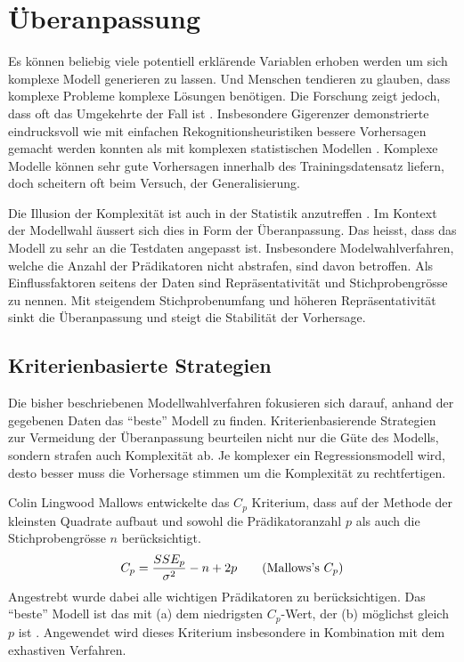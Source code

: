 \section{Überanpassung}
Es können beliebig viele potentiell erklärende Variablen erhoben werden um sich komplexe Modell generieren zu lassen. 
Und Menschen tendieren zu glauben, dass komplexe Probleme komplexe Lösungen benötigen. 
Die Forschung zeigt jedoch, dass oft das Umgekehrte der Fall ist \cite[p.3]{armstrong2011illusions}. 
Insbesondere Gigerenzer demonstrierte eindrucksvoll wie mit einfachen Rekognitionsheuristiken bessere Vorhersagen gemacht werden konnten als mit komplexen statistischen Modellen \cite{borges1999can}.
Komplexe Modelle können sehr gute Vorhersagen innerhalb des Trainingsdatensatz liefern, doch  scheitern oft beim Versuch, der Generalisierung.  

Die Illusion der Komplexität ist auch in der Statistik anzutreffen \cite[p. 3]{armstrong2011illusions}. 
Im Kontext der Modellwahl äussert sich dies in Form der Überanpassung. Das heisst, dass das Modell zu sehr an die Testdaten angepasst ist.
Insbesondere Modelwahlverfahren, welche die Anzahl der Prädikatoren nicht abstrafen, sind davon betroffen.
Als Einflussfaktoren seitens der Daten sind Repräsentativität und Stichprobengrösse zu nennen. 
Mit steigendem Stichprobenumfang und höheren Repräsentativität sinkt die Überanpassung und steigt die Stabilität der Vorhersage.

\subsection{Kriterienbasierte Strategien}
Die bisher beschriebenen Modellwahlverfahren fokusieren sich darauf, anhand der gegebenen Daten das ``beste'' Modell zu finden.
Kriterienbasierende Strategien zur Vermeidung der Überanpassung beurteilen nicht nur die Güte des Modells, sondern strafen auch Komplexität ab.
Je komplexer ein Regressionsmodell wird, desto besser muss die Vorhersage stimmen um die Komplexität zu rechtfertigen.

Colin Lingwood Mallows entwickelte das $C_p$ Kriterium, dass auf der Methode der kleinsten Quadrate  aufbaut und sowohl die Prädikatoranzahl $p$ als auch die Stichprobengrösse $n$ berücksichtigt. 
\begin{equation}
C_p={SSE_p \over \sigma^2} - n + 2p
\tag{Mallows's $C_p$}
\end{equation}
Angestrebt wurde dabei alle wichtigen Prädikatoren zu berücksichtigen. 
Das ``beste'' Modell ist das mit (a) dem niedrigsten $C_p$-Wert, der (b) möglichst gleich $p$ ist \cite{gilmour1996interpretation}. Angewendet wird dieses Kriterium insbesondere in Kombination mit dem exhastiven Verfahren.

